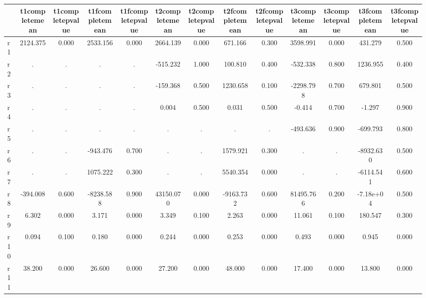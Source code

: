 \begin{table}[htbp]
\begin{tabular}{lcccccccccccc} \hline \hline
 & t1completemean  & t1completepvalue  & t1fcompletemean  & t1fcompletepvalue  & t2completemean  & t2completepvalue  & t2fcompletemean  & t2fcompletepvalue  & t3completemean  & t3completepvalue  & t3fcompletemean  & t3fcompletepvalue  \\  \hline 
r1 &  2124.375 &     0.000 &  2533.156 &     0.000 &  2664.139 &     0.000 &   671.166 &     0.300 &  3598.991 &     0.000 &   431.279 &     0.500 \\  
r2 &         . &         . &         . &         . &  -515.232 &     1.000 &   100.810 &     0.400 &  -532.338 &     0.800 &  1236.955 &     0.400 \\  
r3 &         . &         . &         . &         . &  -159.368 &     0.500 &  1230.658 &     0.100 & -2298.798 &     0.700 &   679.801 &     0.500 \\  
r4 &         . &         . &         . &         . &     0.004 &     0.500 &     0.031 &     0.500 &    -0.414 &     0.700 &    -1.297 &     0.900 \\  
r5 &         . &         . &         . &         . &         . &         . &         . &         . &  -493.636 &     0.900 &  -699.793 &     0.800 \\  
r6 &         . &         . &  -943.476 &     0.700 &         . &         . &  1579.921 &     0.300 &         . &         . & -8932.630 &     0.500 \\  
r7 &         . &         . &  1075.222 &     0.300 &         . &         . &  5540.354 &     0.000 &         . &         . & -6114.541 &     0.600 \\  
r8 &  -394.008 &     0.600 & -8238.588 &     0.900 & 43150.070 &     0.000 & -9163.732 &     0.600 & 81495.766 &     0.200 & -7.18e+04 &     0.500 \\  
r9 &     6.302 &     0.000 &     3.171 &     0.000 &     3.349 &     0.100 &     2.263 &     0.000 &    11.061 &     0.100 &   180.547 &     0.300 \\  
r10 &     0.094 &     0.100 &     0.180 &     0.000 &     0.244 &     0.000 &     0.253 &     0.000 &     0.493 &     0.000 &     0.945 &     0.000 \\  
r11 &    38.200 &     0.000 &    26.600 &     0.000 &    27.200 &     0.000 &    48.000 &     0.000 &    17.400 &     0.000 &    13.800 &     0.000 \\  
\hline \hline \end{tabular}
\end{table}
